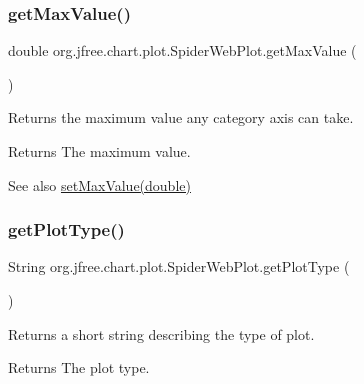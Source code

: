\subsubsection{\texorpdfstring{get\+Max\+Value()}{getMaxValue()}}
{\footnotesize\ttfamily double org.\+jfree.\+chart.\+plot.\+Spider\+Web\+Plot.\+get\+Max\+Value (\begin{DoxyParamCaption}{ }\end{DoxyParamCaption})}

Returns the maximum value any category axis can take.

\begin{DoxyReturn}{Returns}
The maximum value.
\end{DoxyReturn}
\begin{DoxySeeAlso}{See also}
\mbox{\hyperlink{classorg_1_1jfree_1_1chart_1_1plot_1_1_spider_web_plot_ab89290b685699d2351f594c7157689ee}{set\+Max\+Value(double)}} 
\end{DoxySeeAlso}
\mbox{\label{classorg_1_1jfree_1_1chart_1_1plot_1_1_spider_web_plot_ae5e9ffe5d0344fa7fb7ddc4f5e7774f3}} 
\subsubsection{\texorpdfstring{get\+Plot\+Type()}{getPlotType()}}
{\footnotesize\ttfamily String org.\+jfree.\+chart.\+plot.\+Spider\+Web\+Plot.\+get\+Plot\+Type (\begin{DoxyParamCaption}{ }\end{DoxyParamCaption})}

Returns a short string describing the type of plot.

\begin{DoxyReturn}{Returns}
The plot type. 
\end{DoxyReturn}
\mbox{\label{classorg_1_1jfree_1_1chart_1_1plot_1_1_spider_web_plot_af7faf4094e4946adc14230c3621d27fd}} 
